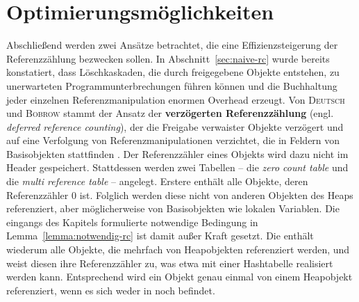\section{Optimierungsmöglichkeiten}
\label{sec:rc-optimizing}
Abschließend werden zwei Ansätze betrachtet, die eine Effizienzsteigerung der Referenzzählung bezwecken sollen.
In Abschnitt~\ref{sec:naive-rc} wurde bereits konstatiert, dass Löschkaskaden, die durch freigegebene Objekte entstehen, zu unerwarteten Programmunterbrechungen führen können und die Buchhaltung jeder einzelnen Referenzmanipulation enormen Overhead erzeugt.
Von \textsc{Deutsch} und \textsc{Bobrow} stammt der Ansatz der \textbf{verzögerten Referenzzählung} (engl. \textit{deferred reference counting}), der die Freigabe verwaister Objekte verzögert und auf eine Verfolgung von Referenzmanipulationen verzichtet, die in Feldern von Basisobjekten stattfinden \cite{deutsch1976}.
Der Referenzzähler eines Objekts wird dazu nicht im Header gespeichert.
Stattdessen werden zwei Tabellen -- die \textit{zero count table}  und die \textit{multi reference table}  -- angelegt.
Erstere enthält alle Objekte, deren Referenzzähler $0$ ist.
Folglich werden diese nicht von anderen Objekten des Heaps referenziert, aber möglicherweise von Basisobjekten wie lokalen Variablen.
Die eingangs des Kapitels formulierte notwendige Bedingung in Lemma~\ref{lemma:notwendig-rc} ist damit außer Kraft gesetzt.
Die  enthält wiederum alle Objekte, die mehrfach von Heapobjekten referenziert werden, und weist diesen ihre Referenzzähler zu, was etwa mit einer Hashtabelle realisiert werden kann.
Entsprechend wird ein Objekt genau einmal von einem Heapobjekt referenziert, wenn es sich weder in  noch  befindet.

